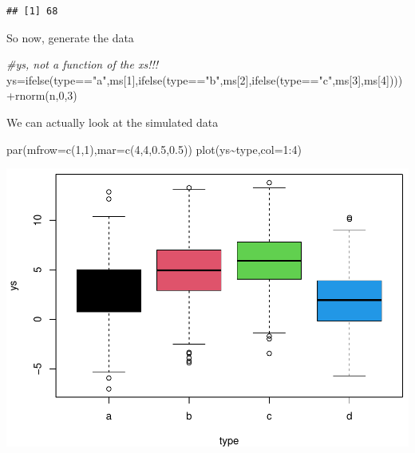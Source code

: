 \documentclass[
]{book}
\newenvironment{Shaded}{\begin{snugshade}}{\end{snugshade}}
\newcommand{\AttributeTok}[1]{\textcolor[rgb]{0.77,0.63,0.00}{#1}}
\newcommand{\CommentTok}[1]{\textcolor[rgb]{0.56,0.35,0.01}{\textit{#1}}}
\newcommand{\DecValTok}[1]{\textcolor[rgb]{0.00,0.00,0.81}{#1}}
\newcommand{\FloatTok}[1]{\textcolor[rgb]{0.00,0.00,0.81}{#1}}
\newcommand{\FunctionTok}[1]{\textcolor[rgb]{0.00,0.00,0.00}{#1}}
\newcommand{\NormalTok}[1]{#1}
\newcommand{\OtherTok}[1]{\textcolor[rgb]{0.56,0.35,0.01}{#1}}
\newcommand{\SpecialCharTok}[1]{\textcolor[rgb]{0.00,0.00,0.00}{#1}}
\newcommand{\StringTok}[1]{\textcolor[rgb]{0.31,0.60,0.02}{#1}}
\begin{document}
\begin{verbatim}
## [1] 68
\end{verbatim}

So now, generate the data

\begin{Shaded}
\begin{Highlighting}[]
\CommentTok{\#ys, not a function of the xs!!!}
\NormalTok{ys}\OtherTok{=}\FunctionTok{ifelse}\NormalTok{(type}\SpecialCharTok{==}\StringTok{"a"}\NormalTok{,ms[}\DecValTok{1}\NormalTok{],}\FunctionTok{ifelse}\NormalTok{(type}\SpecialCharTok{==}\StringTok{"b"}\NormalTok{,ms[}\DecValTok{2}\NormalTok{],}\FunctionTok{ifelse}\NormalTok{(type}\SpecialCharTok{==}\StringTok{"c"}\NormalTok{,ms[}\DecValTok{3}\NormalTok{],ms[}\DecValTok{4}\NormalTok{])))}\SpecialCharTok{+}\FunctionTok{rnorm}\NormalTok{(n,}\DecValTok{0}\NormalTok{,}\DecValTok{3}\NormalTok{)}
\end{Highlighting}
\end{Shaded}

We can actually look at the simulated data

\begin{Shaded}
\begin{Highlighting}[]
\FunctionTok{par}\NormalTok{(}\AttributeTok{mfrow=}\FunctionTok{c}\NormalTok{(}\DecValTok{1}\NormalTok{,}\DecValTok{1}\NormalTok{),}\AttributeTok{mar=}\FunctionTok{c}\NormalTok{(}\DecValTok{4}\NormalTok{,}\DecValTok{4}\NormalTok{,}\FloatTok{0.5}\NormalTok{,}\FloatTok{0.5}\NormalTok{))}
\FunctionTok{plot}\NormalTok{(ys}\SpecialCharTok{\textasciitilde{}}\NormalTok{type,}\AttributeTok{col=}\DecValTok{1}\SpecialCharTok{:}\DecValTok{4}\NormalTok{)}
\end{Highlighting}
\end{Shaded}

\includegraphics{ECOMODbook_files/figure-latex/a8.26-1.pdf}
\end{document}
